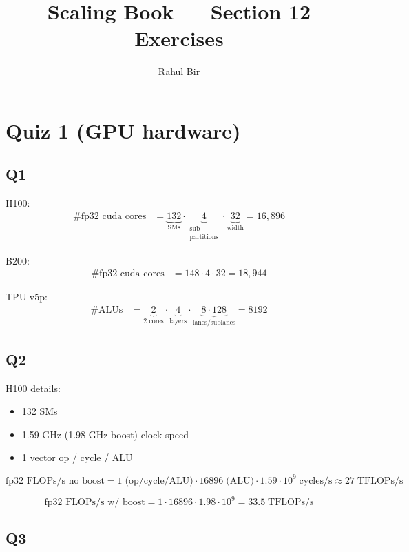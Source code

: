 \documentclass[11pt]{article}
\title{Scaling Book --- Section 12 Exercises}
\author{Rahul Bir}
\date{}
\begin{document}
\maketitle

\section*{Quiz 1 (GPU hardware)}

\subsection*{Q1}

H100:
\begin{align*}
\text{\# fp32 cuda cores} &= \underbrace{132}_{\text{SMs}} \cdot \underbrace{4}_{\substack{\text{sub-}\\ \text{partitions}}} \cdot \underbrace{32}_{\text{width}} = 16{,}896
\end{align*}

B200:
\begin{align*}
\text{\# fp32 cuda cores} &= 148 \cdot 4 \cdot 32 = 18{,}944
\end{align*}

TPU v5p:
\begin{align*}
\text{\# ALUs} &= \underbrace{2}_{\text{2 cores}} \cdot \underbrace{4}_{\text{layers}} \cdot \underbrace{8 \cdot 128}_{\text{lanes/sublanes}} = 8192
\end{align*}

\subsection*{Q2}

H100 details:
\begin{itemize}[leftmargin=1.5em]
    \item 132 SMs
    \item 1.59 GHz (1.98 GHz boost) clock speed
    \item 1 vector op / cycle / ALU
\end{itemize}

\[
\text{fp32 FLOPs/s no boost} = 1 \;\text{(op/cycle/ALU)} \cdot 16896 \;\text{(ALU)} \cdot 1.59 \cdot 10^9 \;\text{cycles/s} \approx 27 \;\text{TFLOPs/s}
\]

\[
\text{fp32 FLOPs/s w/ boost} = 1 \cdot 16896 \cdot 1.98 \cdot 10^9 = 33.5 \;\text{TFLOPs/s}
\]

\subsection*{Q3}
\end{document}
